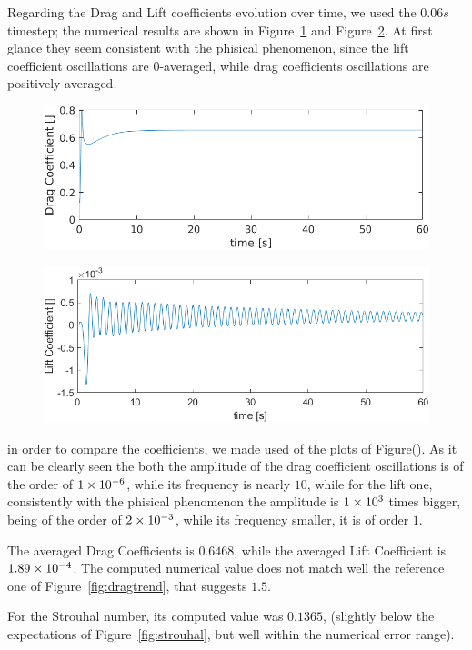 \documentclass[12pt]{article}
\begin{document}
        Regarding the Drag and Lift coefficients evolution over time, we used the $0.06 s$ timestep; the numerical results are shown in Figure~\ref{fig:drag_coeff} and  Figure~\ref{fig:lift_coeff}. At first glance they seem consistent with the phisical phenomenon, since the lift coefficient oscillations are 0-averaged, while drag coefficients oscillations are positively averaged. 

        \begin{figure}[!ht]
                \includegraphics[width=\textwidth]{Drag_Coefficient.png}
                \centering
                \caption{}
                \label{fig:drag_coeff}
        \end{figure}
                \begin{figure}[!ht]
                \includegraphics[width=\textwidth]{Lift_Coefficient.png}
                \centering
                \caption{}
                \label{fig:lift_coeff}
        \end{figure}


        in order to compare the coefficients, we made used of the plots of Figure(). As it can be clearly seen the both the amplitude of the drag coefficient oscillations is of the order of $\num{1E-6}$, while its frequency is nearly $10$, while for the lift one, consistently with the phisical phenomenon the amplitude is $\num{1E3}$ times bigger, being of the order of $\num{2E-3}$, while its frequency smaller, it is of order $1$. 

        The averaged Drag Coefficients is $\num{0.6468}$, while the averaged Lift Coefficient is $\num{1.89E-4}$. The computed numerical value does not match well the reference one of Figure~\ref{fig:dragtrend}, that suggests $1.5$.

        For the Strouhal number, its computed value was $0.1365$, (slightly below the expectations of Figure~\ref{fig:strouhal}, but well within the numerical error range). 



\end{document}
